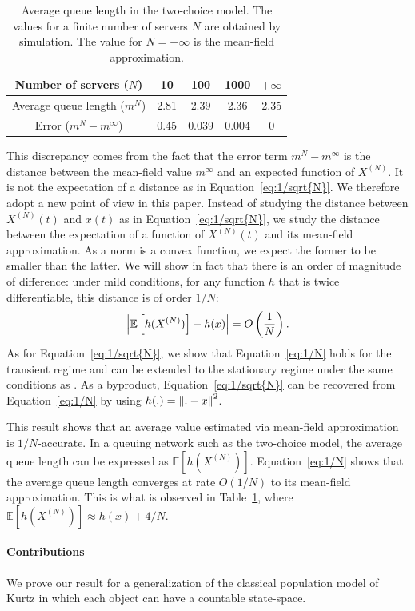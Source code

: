 \documentclass[sigconf]{acmart}
\newcommand\XN{X^{(N)}}
\newcommand\esp[1]{{\mathchoice{\besp{#1}}{\sesp{#1}}{\sesp{#1}}{\sesp{#1}}}}
\newcommand\besp[1]{\mathbb{E}\left[#1\right]}
\newcommand\sesp[1]{\mathbb{E}[#1]}
\newcommand\norm[1]{{\mathchoice{\bnorm{#1}}{\snorm{#1}}{\snorm{#1}}{\snorm{#1}}}}
\newcommand\bnorm[1]{\left\|#1\right\|}
\newcommand\snorm[1]{\|#1\|}
\newcommand\abs[1]{\left|#1\right|}
\newcommand\p[1]{\left(#1\right)}
\begin{document}
\begin{table}[ht]
  \centering
  \begin{tabular}{|c|c|c|c|c|}
    \hline
    Number of servers ($N$) & 10 & 100 & 1000 &$+\infty$\\\hline
    Average queue length ($m^N$) &2.81&2.39&2.36& 2.35\\\hline
    Error ($m^N-m^\infty$) & 0.45 & 0.039 & 0.004 & 0 \\\hline
  \end{tabular}
  \caption{Average queue length in the two-choice model. The values for a
    finite number of servers
    $N$ are obtained by simulation. The value for $N=+\infty$ is the
    mean-field approximation. }
  \label{tab:power2}
\end{table}

This discrepancy comes from the fact that the error term
$m^N-m^\infty$ is the distance between the mean-field value $m^\infty$
and an expected function of $\XN$. It is not the expectation of a
distance as in Equation~\eqref{eq:1/sqrt{N}}. We therefore adopt a new
point of view in this paper. Instead of studying the distance between
$\XN(t)$ and $x(t)$ as in Equation~\eqref{eq:1/sqrt{N}}, we study the
distance between the expectation of a function of $\XN(t)$ and its
mean-field approximation.  As a norm is a convex function, we expect
the former to be smaller than the latter. We will show in fact that
there is an order of magnitude of difference: under mild conditions,
for any function $h$ that is twice differentiable, this distance is of
order $1/N$:
\begin{align}
  \label{eq:1/N}
  \abs{\esp{h(\XN)} - h(x)} = O\p{\frac1N}.
\end{align}
As for Equation~\eqref{eq:1/sqrt{N}}, we show that
Equation~\eqref{eq:1/N} holds for the transient regime and can be
extended to the stationary regime under the same conditions as
\cite{ying2016rate}.  As a byproduct, Equation~\eqref{eq:1/sqrt{N}}
can be recovered from Equation~\eqref{eq:1/N} by using
$h(.)=\norm{.-x}^2$.

This result shows that an average value estimated via mean-field
approximation is $1/N$-accurate.  In a queuing network such as the
two-choice model, the average queue length can be expressed as
$\sesp{h(\XN)}$.  Equation~\eqref{eq:1/N} shows that the average queue
length converges at rate $O(1/N)$ to its mean-field approximation.
This is what is observed in Table~\ref{tab:power2}, where 
$\sesp{h(\XN)}\approx h(x)+4/N$.

\paragraph*{Contributions}
We prove our result for a generalization of the classical population
model of Kurtz in which each object can have a countable
state-space.
\end{document}
